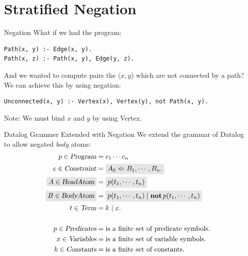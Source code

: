 \section{Stratified Negation}

\begin{frame}[fragile]{Negation}
What if we had the program:

\begin{lstlisting}[language=flix,xleftmargin=0.8cm]
Path(x, y) :- Edge(x, y).
Path(x, z) :- Path(x, y), Edge(y, z).
\end{lstlisting}

\pause

And we wanted to compute pairs the $(x, y$) which are not connected by a path?
We can achieve this by using negation:

\begin{lstlisting}[language=flix,xleftmargin=0.8cm]
Unconnected(x, y) :- Vertex(x), Vertex(y), not Path(x, y).
\end{lstlisting}

Note: We must bind $x$ and $y$ by using \textsf{Vertex}.
\end{frame}

\begin{frame}{Datalog Grammer Extended with Negation}
We extend the grammar of Datalog to allow negated \emph{body} atoms:
{
\large
\begin{align*}
p \in \textsl{Program}      &= c_1 \cdots c_n \\
c \in \textsl{Constraint}   &= \Highlight{A_0 \Leftarrow B_1, \cdots, B_n.} \\ 
\Highlight{A \in \textsl{HeadAtom}}     &= \Highlight{p(t_1, \cdots, t_n)} \\
\Highlight{B \in \textsl{BodyAtom}}     &= \Highlight{p(t_1, \cdots, t_n) \mid \text{\textbf{not}} \, p(t_1, \cdots, t_n)} \\
t \in \textsl{Term}         &= k \mid x. \\
\\
p \in \textsl{Predicates}   & = \text{is a finite set of predicate symbols.} \\
x \in \textsl{Variables}    & = \text{is a finite set of variable symbols.} \\
k \in \textsl{Constants}    & = \text{is a finite set of constants.}
\end{align*}
}
\end{frame}

